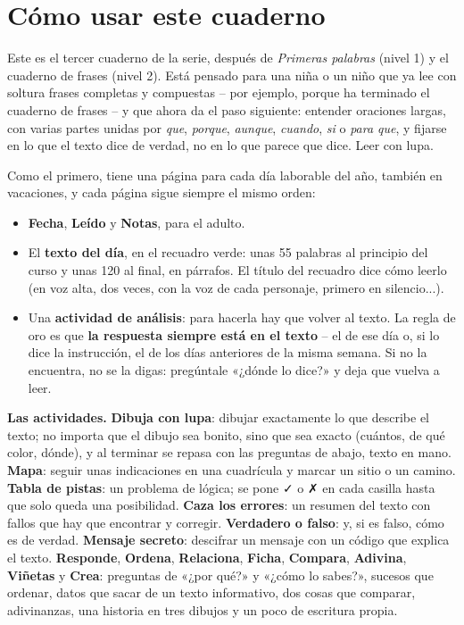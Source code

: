 \section*{Cómo usar este cuaderno}

Este es el tercer cuaderno de la serie, después de \textit{Primeras
palabras} (nivel 1) y el cuaderno de frases (nivel 2). Está pensado para
una niña o un niño que ya lee con soltura frases completas y compuestas
-- por ejemplo, porque ha terminado el cuaderno de frases -- y que ahora
da el paso siguiente: entender oraciones largas, con varias partes unidas por
\textit{que}, \textit{porque}, \textit{aunque}, \textit{cuando},
\textit{si} o \textit{para que}, y fijarse en lo que el texto dice de
verdad, no en lo que parece que dice. Leer con lupa.

Como el primero, tiene una página para cada día laborable del año,
también en vacaciones, y cada página sigue siempre el mismo orden:

\begin{itemize}[leftmargin=6mm, itemsep=1mm]
\item \textbf{Fecha}, \textbf{Leído} y \textbf{Notas}, para el adulto.
\item El \textbf{texto del día}, en el recuadro verde: unas 55 palabras
  al principio del curso y unas 120 al final, en párrafos. El título del
  recuadro dice cómo leerlo (en voz alta, dos veces, con la voz de cada
  personaje, primero en silencio...).
\item Una \textbf{actividad de análisis}: para hacerla hay que volver al
  texto. La regla de oro es que \textbf{la respuesta siempre está en el
  texto} -- el de ese día o, si lo dice la instrucción, el de los días
  anteriores de la misma semana. Si no la encuentra, no se la digas:
  pregúntale «¿dónde lo dice?» y deja que vuelva a leer.
\end{itemize}

\textbf{Las actividades.} \textbf{Dibuja con lupa}: dibujar exactamente
lo que describe el texto; no importa que el dibujo sea bonito, sino que
sea exacto (cuántos, de qué color, dónde), y al terminar se repasa con
las preguntas de abajo, texto en mano. \textbf{Mapa}: seguir unas
indicaciones en una cuadrícula y marcar un sitio o un camino.
\textbf{Tabla de pistas}: un problema de lógica; se pone ✓ o
✗ en cada casilla hasta que solo queda una posibilidad.
\textbf{Caza los errores}: un resumen del texto con fallos que hay que
encontrar y corregir. \textbf{Verdadero o falso}: y, si es falso, cómo es
de verdad. \textbf{Mensaje secreto}: descifrar un mensaje con un código
que explica el texto. \textbf{Responde}, \textbf{Ordena},
\textbf{Relaciona}, \textbf{Ficha}, \textbf{Compara}, \textbf{Adivina},
\textbf{Viñetas} y \textbf{Crea}: preguntas de «¿por qué?» y «¿cómo
lo sabes?», sucesos que ordenar, datos que sacar de un texto
informativo, dos cosas que comparar, adivinanzas, una historia en tres
dibujos y un poco de escritura propia.


